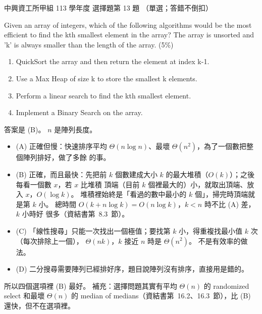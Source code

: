 \begin{pastexam}[label={px:nchu-113-dsa-13}]{中興資工所甲組 113 學年度 選擇題第 13 題}
（單選；答錯不倒扣）

Given an array of integers, which of the following algorithms would be the most efficient to find the kth
smallest element in the array? The array is unsorted and 'k' is always smaller than the length of the
array. (5\%)
\begin{enumerate}[label=(\Alph*)]
\item QuickSort the array and then return the element at index k-1.
\item Use a Max Heap of size k to store the smallest k elements.
\item Perform a linear search to find the kth smallest element.
\item Implement a Binary Search on the array.
\end{enumerate}
\end{pastexam}

\begin{pastsoln}
答案是 (B)。 $n$ 是陣列長度。
\begin{itemize}
\item (A) 正確但慢：快速排序平均 $\Theta(n \log n)$、最壞 $\Theta(n^2)$，為了一個數把整個陣列排好，做了多餘
的事。
\item (B) 正確，而且最快：先把前 $k$ 個數建成大小 $k$ 的最大堆積（$O(k)$）；之後每看一個數 $x$，若 $x$ 比堆積
頂端（目前 $k$ 個裡最大的）小，就取出頂端、放入 $x$，$O(\log k)$。 堆積裡始終是「看過的數中最小的 $k$
個」，掃完時頂端就是第 $k$ 小。 總時間 $O(k + n \log k) = O(n \log k)$，$k < n$ 時不比 (A) 差，$k$ 小時好
很多（資結書第~8.3~節）。
\item (C) 「線性搜尋」只能一次找出一個極值；要找第 $k$ 小，得重複找最小值 $k$ 次（每次排除上一個），
$\Theta(nk)$，$k$ 接近 $n$ 時是 $\Theta(n^2)$。 不是有效率的做法。
\item (D) 二分搜尋需要陣列已經排好序，題目說陣列沒有排序，直接用是錯的。
\end{itemize}
所以四個選項裡 (B) 最好。 補充：選擇問題其實有平均 $\Theta(n)$ 的 randomized select 和最壞 $\Theta(n)$ 的
median of medians（資結書第~16.2、16.3~節），比 (B) 還快，但不在選項裡。
\end{pastsoln}
